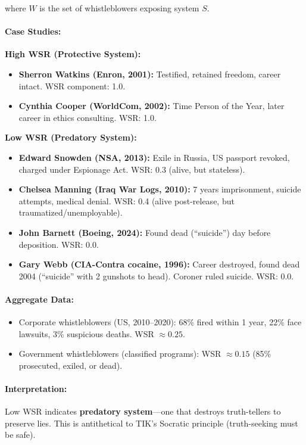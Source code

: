 \documentclass[11pt,a4paper]{article}
\theoremstyle{definition}
\theoremstyle{remark}
\begin{document}
where $W$ is the set of whistleblowers exposing system $S$.

\paragraph{Case Studies:}

\textbf{High WSR (Protective System):}
\begin{itemize}
\item \textbf{Sherron Watkins (Enron, 2001):} Testified, retained freedom, career intact. WSR component: 1.0.
\item \textbf{Cynthia Cooper (WorldCom, 2002):} Time Person of the Year, later career in ethics consulting. WSR: 1.0.
\end{itemize}

\textbf{Low WSR (Predatory System):}
\begin{itemize}
\item \textbf{Edward Snowden (NSA, 2013):} Exile in Russia, US passport revoked, charged under Espionage Act. WSR: 0.3 (alive, but stateless).
\item \textbf{Chelsea Manning (Iraq War Logs, 2010):} 7 years imprisonment, suicide attempts, medical denial. WSR: 0.4 (alive post-release, but traumatized/unemployable).
\item \textbf{John Barnett (Boeing, 2024):} Found dead (``suicide'') day before deposition. WSR: 0.0.
\item \textbf{Gary Webb (CIA-Contra cocaine, 1996):} Career destroyed, found dead 2004 (``suicide'' with 2 gunshots to head). Coroner ruled suicide. WSR: 0.0.
\end{itemize}

\paragraph{Aggregate Data:}
\begin{itemize}
\item Corporate whistleblowers (US, 2010–2020): 68\% fired within 1 year, 22\% face lawsuits, 3\% suspicious deaths. WSR $\approx 0.25$.
\item Government whistleblowers (classified programs): WSR $\approx 0.15$ (85\% prosecuted, exiled, or dead).
\end{itemize}

\paragraph{Interpretation:}
Low WSR indicates \textbf{predatory system}—one that destroys truth-tellers to preserve lies. This is antithetical to TIK's Socratic principle (truth-seeking must be safe).
\end{document}
